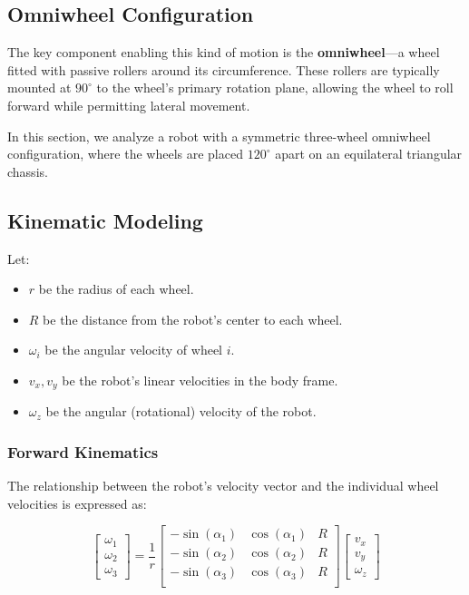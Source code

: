 \documentclass{article}
\begin{document}
\subsection{Omniwheel Configuration}

The key component enabling this kind of motion is the \textbf{omniwheel}—a wheel fitted with passive rollers around its circumference. These rollers are typically mounted at $90^\circ$ to the wheel's primary rotation plane, allowing the wheel to roll forward while permitting lateral movement.

In this section, we analyze a robot with a symmetric three-wheel omniwheel configuration, where the wheels are placed $120^\circ$ apart on an equilateral triangular chassis.

\subsection{Kinematic Modeling}

Let:
\begin{itemize}
    \item $r$ be the radius of each wheel.
    \item $R$ be the distance from the robot's center to each wheel.
    \item $\omega_i$ be the angular velocity of wheel $i$.
    \item $v_x, v_y$ be the robot's linear velocities in the body frame.
    \item $\omega_z$ be the angular (rotational) velocity of the robot.
\end{itemize}

\subsubsection{Forward Kinematics}

The relationship between the robot’s velocity vector and the individual wheel velocities is expressed as:

\[
\begin{bmatrix}
\omega_1 \\
\omega_2 \\
\omega_3
\end{bmatrix}
= \frac{1}{r}
\begin{bmatrix}
-\sin(\alpha_1) & \cos(\alpha_1) & R \\
-\sin(\alpha_2) & \cos(\alpha_2) & R \\
-\sin(\alpha_3) & \cos(\alpha_3) & R \\
\end{bmatrix}
\begin{bmatrix}
v_x \\
v_y \\
\omega_z
\end{bmatrix}
\]
\end{document}

